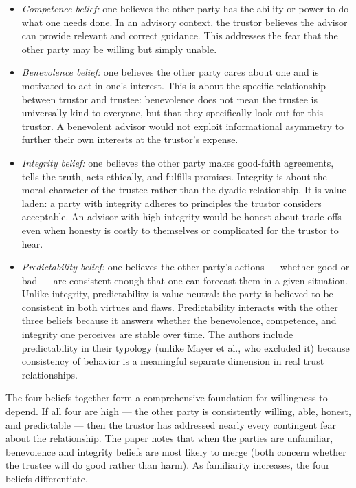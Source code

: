 \documentclass[11pt, a4paper]{article}
\begin{document}
\begin{itemize}
  \item \textit{Competence belief:} one believes the other party has the ability or power to do what one needs done. In an advisory context, the trustor believes the advisor can provide relevant and correct guidance. This addresses the fear that the other party may be willing but simply unable.
  \item \textit{Benevolence belief:} one believes the other party cares about one and is motivated to act in one's interest. This is about the specific relationship between trustor and trustee: benevolence does not mean the trustee is universally kind to everyone, but that they specifically look out for this trustor. A benevolent advisor would not exploit informational asymmetry to further their own interests at the trustor's expense.
  \item \textit{Integrity belief:} one believes the other party makes good-faith agreements, tells the truth, acts ethically, and fulfills promises. Integrity is about the moral character of the trustee rather than the dyadic relationship. It is value-laden: a party with integrity adheres to principles the trustor considers acceptable. An advisor with high integrity would be honest about trade-offs even when honesty is costly to themselves or complicated for the trustor to hear.
  \item \textit{Predictability belief:} one believes the other party's actions --- whether good or bad --- are consistent enough that one can forecast them in a given situation. Unlike integrity, predictability is value-neutral: the party is believed to be consistent in both virtues and flaws. Predictability interacts with the other three beliefs because it answers whether the benevolence, competence, and integrity one perceives are stable over time. The authors include predictability in their typology (unlike Mayer et al., who excluded it) because consistency of behavior is a meaningful separate dimension in real trust relationships.
\end{itemize}

The four beliefs together form a comprehensive foundation for willingness to depend. If all four are high --- the other party is consistently willing, able, honest, and predictable --- then the trustor has addressed nearly every contingent fear about the relationship. The paper notes that when the parties are unfamiliar, benevolence and integrity beliefs are most likely to merge (both concern whether the trustee will do good rather than harm). As familiarity increases, the four beliefs differentiate.
\end{document}
